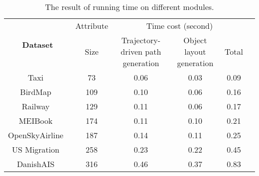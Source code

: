 \begin{table*}[t]
  \centering
  \setlength{\abovecaptionskip}{1mm}
  \caption{The result of running time on different modules.}
  \label{tab:time_result} %
  \begin{tabular}{c|ccccc}
    \toprule
    \multirow{2}{*}{\textbf{Dataset}}
    & \multicolumn{1}{c}{Attribute}
    & \multicolumn{3}{c}{Time cost (second)} \\
    \cmidrule(lr){2-2} \cmidrule(l){3-5}
    & {Size}
    & {Trajectory-driven path generation}
    & {Object layout generation} & {Total} \\
    \midrule
    Taxi~\cite{yuan2011drive, yuan2010tdrive} &
     73 & 0.06 & 0.03 & 0.09 \\
    BirdMap~\cite{BirdMap} &
     109 & 0.10 & 0.06 & 0.16 \\
    Railway~\cite{railway} &
     129 & 0.11 & 0.06 & 0.17 \\
    MEIBook~\cite{mei} &
     174 & 0.11 & 0.10 & 0.21 \\
    OpenSkyAirline~\cite{opensky} &
     187 & 0.14 & 0.11 & 0.25 \\
    US Migration~\cite{holten2009force} &
     258 & 0.23 & 0.22 & 0.45 \\
    DanishAIS~\cite{DanishAIS} &
     316 & 0.46 & 0.37 & 0.83 \\
    \bottomrule
  \end{tabular}
  \vspace{-3mm}
\end{table*}